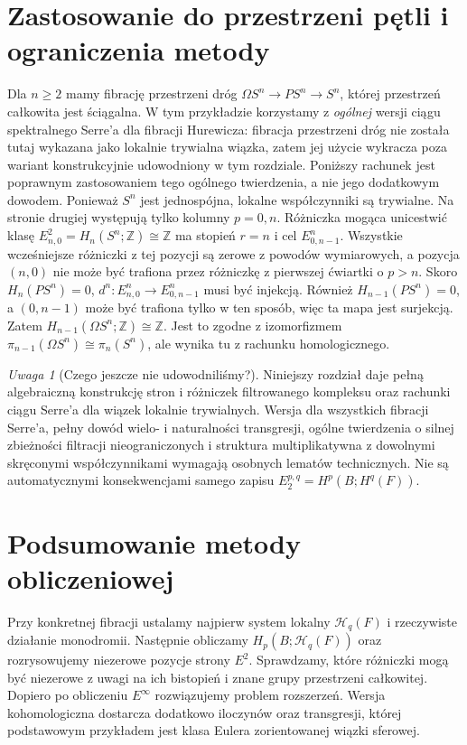 \documentclass[11pt,a4paper,oneside]{report}
\newcommand{\Z}{\mathbb{Z}}
\theoremstyle{plain}
\theoremstyle{definition}
\theoremstyle{remark}
\newtheorem{uwaga}[twierdzenie]{Uwaga}
\begin{document}
\section{Zastosowanie do przestrzeni pętli i ograniczenia metody}
Dla $n\ge2$ mamy fibrację przestrzeni dróg
$\Omega S^n\to PS^n\to S^n$, której przestrzeń całkowita
jest ściągalna. W tym przykładzie korzystamy z \emph{ogólnej}
wersji ciągu spektralnego Serre'a dla fibracji Hurewicza:
fibracja przestrzeni dróg nie została tutaj wykazana jako
lokalnie trywialna wiązka, zatem jej użycie wykracza poza
wariant konstrukcyjnie udowodniony w tym rozdziale.
Poniższy rachunek jest poprawnym zastosowaniem tego
ogólnego twierdzenia, a nie jego dodatkowym dowodem. Ponieważ $S^n$ jest jednospójna,
lokalne współczynniki są trywialne. Na stronie drugiej
występują tylko kolumny $p=0,n$.
Różniczka mogąca unicestwić klasę
$E^2_{n,0}=H_n(S^n;\Z)\cong\Z$ ma stopień $r=n$
i cel $E^n_{0,n-1}$. Wszystkie wcześniejsze różniczki
z tej pozycji są zerowe z powodów wymiarowych,
a pozycja $(n,0)$ nie może być trafiona przez różniczkę
z pierwszej ćwiartki o $p>n$. Skoro $H_n(PS^n)=0$,
$d^n:E^n_{n,0}\to E^n_{0,n-1}$ musi być injekcją.
Również $H_{n-1}(PS^n)=0$, a $(0,n-1)$ może być
trafiona tylko w ten sposób, więc ta mapa jest surjekcją.
Zatem $H_{n-1}(\Omega S^n;\Z)\cong\Z$.
Jest to zgodne z izomorfizmem
$\pi_{n-1}(\Omega S^n)\cong\pi_n(S^n)$, ale wynika tu
z rachunku homologicznego.

\begin{uwaga}[Czego jeszcze nie udowodniliśmy?]
Niniejszy rozdział daje pełną algebraiczną konstrukcję
stron i różniczek filtrowanego kompleksu oraz rachunki
ciągu Serre'a dla wiązek lokalnie trywialnych.
Wersja dla wszystkich fibracji Serre'a, pełny dowód
wielo- i naturalności transgresji, ogólne twierdzenia o
silnej zbieżności filtracji nieograniczonych i struktura
multiplikatywna z dowolnymi skręconymi współczynnikami
wymagają osobnych lematów technicznych. Nie są automatycznymi
konsekwencjami samego zapisu $E_2^{p,q}=H^p(B;H^q(F))$.
\end{uwaga}

\section{Podsumowanie metody obliczeniowej}
Przy konkretnej fibracji ustalamy najpierw system lokalny
$\mathcal H_q(F)$ i rzeczywiste działanie monodromii.
Następnie obliczamy $H_p(B;\mathcal H_q(F))$ oraz
rozrysowujemy niezerowe pozycje strony $E^2$.
Sprawdzamy, które różniczki mogą być niezerowe z uwagi
na ich bistopień i znane grupy przestrzeni całkowitej.
Dopiero po obliczeniu $E^\infty$ rozwiązujemy problem
rozszerzeń. Wersja kohomologiczna dostarcza dodatkowo
iloczynów oraz transgresji, której podstawowym przykładem
jest klasa Eulera zorientowanej wiązki sferowej.
\clearpage
\end{document}
